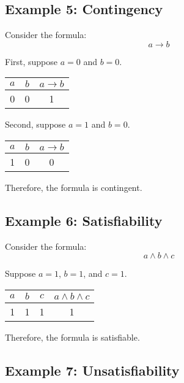 \documentclass[12pt,a4paper,openany]{article}
\begin{document}
\subsection{Example 5: Contingency}

Consider the formula:
$$ a \to b $$

First, suppose $a = 0$ and $b = 0$.

\begin{center}
\begin{tabular}{|c|c|c|}
\hline
$a$ & $b$ & $a \to b$ \\
\hline
\textcolor{falsecolor}{0} & \textcolor{falsecolor}{0} & \textcolor{truecolor}{1} \\
\hline
\end{tabular}
\end{center}

Second, suppose $a = 1$ and $b = 0$.

\begin{center}
\begin{tabular}{|c|c|c|}
\hline
$a$ & $b$ & $a \to b$ \\
\hline
\textcolor{truecolor}{1} & \textcolor{falsecolor}{0} & \textcolor{falsecolor}{0} \\
\hline
\end{tabular}
\end{center}

Therefore, the formula is contingent.

\subsection{Example 6: Satisfiability}

Consider the formula:
$$ a \land b \land c $$

Suppose $a = 1$, $b = 1$, and $c = 1$.

\begin{center}
\begin{tabular}{|c|c|c|c|}
\hline
$a$ & $b$ & $c$ & $a \land b \land c$ \\
\hline
\textcolor{truecolor}{1} & \textcolor{truecolor}{1} & \textcolor{truecolor}{1} & \textcolor{truecolor}{1} \\
\hline
\end{tabular}
\end{center}

Therefore, the formula is satisfiable.

\subsection{Example 7: Unsatisfiability}
\end{document}
